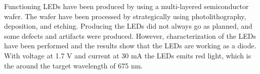 

Functioning LEDs have been produced by using a multi-layered semiconductor wafer.
The wafer have been processed by strategically using photolithography, deposition, and etching.
Producing the LEDs did not always go as planned, and some defects and artifacts were produced.
However, characterization of the LEDs have been performed and the results show that the LEDs are working as a diode.
With voltage at 1.7 V and current at 30 mA the LEDs emits red light, which is the around the target wavelength of 675 nm.